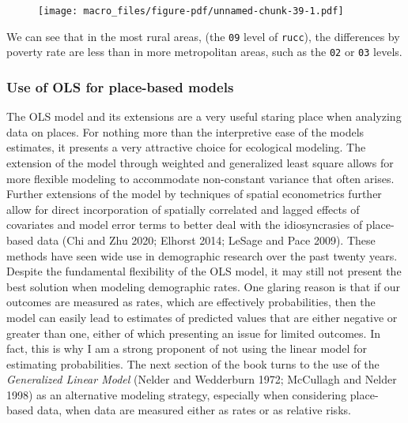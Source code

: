 \documentclass[
  letterpaper,
  DIV=11,
  numbers=noendperiod]{scrreprt}
\begin{document}
\begin{figure}[H]

{\centering \texttt{[image: macro\_files/figure-pdf/unnamed-chunk-39-1.pdf]}

}

\end{figure}

We can see that in the most rural areas, (the \texttt{09} level of
\texttt{rucc}), the differences by poverty rate are less than in more
metropolitan areas, such as the \texttt{02} or \texttt{03} levels.

\hypertarget{use-of-ols-for-place-based-models}{%
\subsubsection{Use of OLS for place-based
models}\label{use-of-ols-for-place-based-models}}

The OLS model and its extensions are a very useful staring place when
analyzing data on places. For nothing more than the interpretive ease of
the models estimates, it presents a very attractive choice for
ecological modeling. The extension of the model through weighted and
generalized least square allows for more flexible modeling to
accommodate non-constant variance that often arises. Further extensions
of the model by techniques of spatial econometrics further allow for
direct incorporation of spatially correlated and lagged effects of
covariates and model error terms to better deal with the idiosyncrasies
of place-based data (Chi and Zhu 2020; Elhorst 2014; LeSage and Pace
2009). These methods have seen wide use in demographic research over the
past twenty years. Despite the fundamental flexibility of the OLS model,
it may still not present the best solution when modeling demographic
rates. One glaring reason is that if our outcomes are measured as rates,
which are effectively probabilities, then the model can easily lead to
estimates of predicted values that are either negative or greater than
one, either of which presenting an issue for limited outcomes. In fact,
this is why I am a strong proponent of not using the linear model for
estimating probabilities. The next section of the book turns to the use
of the \emph{Generalized Linear Model} (Nelder and Wedderburn 1972;
McCullagh and Nelder 1998) as an alternative modeling strategy,
especially when considering place-based data, when data are measured
either as rates or as relative risks.

\newpage
\end{document}
